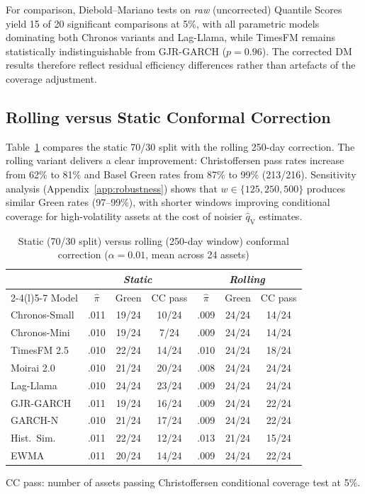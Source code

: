\documentclass[preprint,11pt,authoryear]{elsarticle}
\newcommand{\1}{\boldsymbol{1}}
\newcommand{\qV}{\hat{q}_{\scriptscriptstyle\mathrm{V}}}
\begin{document}
	For comparison, Diebold--Mariano tests on \emph{raw}
	(uncorrected) Quantile Scores yield 15 of 20 significant
	comparisons at 5\%, with all parametric models dominating
	both Chronos variants and Lag-Llama, while TimesFM remains
	statistically indistinguishable from GJR-GARCH ($p = 0.96$).
	The corrected DM results therefore reflect residual efficiency
	differences rather than artefacts of the coverage adjustment.
	
	\subsection{Rolling versus Static Conformal Correction}
	\label{sec:rolling_results}
	
	Table~\ref{tab:rolling_vs_static} compares the static 70/30
	split with the rolling 250-day correction. The rolling variant
	delivers a clear improvement: Christoffersen pass rates
	increase from 62\% to 81\% and Basel Green rates from 87\%
	to 99\% (213/216). Sensitivity analysis
	(Appendix~\ref{app:robustness}) shows that
	$w \in \{125, 250, 500\}$ produces similar Green rates
	(97--99\%), with shorter windows improving conditional
	coverage for high-volatility assets at the cost of noisier
	$\qV$ estimates.
	
	\begin{table}[H]
		\centering
		\caption{Static (70/30 split) versus rolling (250-day window) conformal correction ($\alpha = 0.01$, mean across 24 assets)}
		\label{tab:rolling_vs_static}
		\footnotesize
		\begin{tabular}{@{}lcccccc@{}}
			\toprule
			& \multicolumn{3}{c}{\textit{Static}} & \multicolumn{3}{c}{\textit{Rolling}} \\
			\cmidrule(lr){2-4}\cmidrule(l){5-7}
			Model & $\hat\pi$ & Green & CC pass & $\hat\pi$ & Green & CC pass \\
			\midrule
			Chronos-Small  & .011 & 19/24 & 10/24 & .009 & 24/24 & 14/24 \\
			Chronos-Mini   & .010 & 19/24 &  7/24 & .009 & 24/24 & 14/24 \\
			TimesFM 2.5    & .010 & 22/24 & 14/24 & .010 & 24/24 & 18/24 \\
			Moirai 2.0     & .010 & 21/24 & 20/24 & .008 & 24/24 & 24/24 \\
			Lag-Llama      & .010 & 24/24 & 23/24 & .009 & 24/24 & 24/24 \\
			\midrule
			GJR-GARCH      & .011 & 19/24 & 16/24 & .009 & 24/24 & 22/24 \\
			GARCH-N        & .010 & 21/24 & 17/24 & .009 & 24/24 & 22/24 \\
			Hist.\ Sim.    & .011 & 22/24 & 12/24 & .013 & 21/24 & 15/24 \\
			EWMA           & .011 & 20/24 & 14/24 & .009 & 24/24 & 22/24 \\
			\bottomrule
		\end{tabular}
		\begin{minipage}{\linewidth}\scriptsize
			\smallskip
			CC pass: number of assets passing Christoffersen conditional coverage test at 5\%. 
		\end{minipage}
	\end{table}
	
\end{document}
